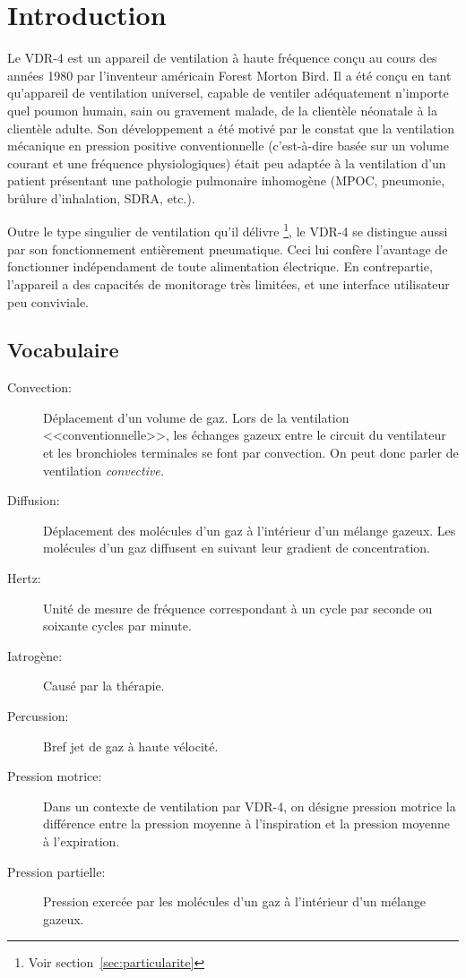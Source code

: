 \chapter{Introduction}

Le VDR-4 est un appareil de ventilation à haute fréquence conçu au cours des
années 1980\cite{Vienne2008} par l'inventeur américain Forest Morton Bird.  Il a été conçu en
tant qu'appareil de ventilation universel, capable de ventiler adéquatement
n'importe quel poumon humain, sain ou gravement malade, de la clientèle
néonatale à la clientèle adulte.  Son développement a été motivé par le constat
que la ventilation mécanique en pression positive conventionnelle (c'est-à-dire
basée sur un volume courant et une fréquence physiologiques) était peu adaptée
à la ventilation d'un patient présentant une pathologie pulmonaire inhomogène
(MPOC, pneumonie, brûlure d'inhalation, SDRA, etc.).

Outre le type singulier de ventilation qu'il délivre \footnote{Voir
section~\ref{sec:particularite}}, le VDR-4 se distingue aussi par son
fonctionnement entièrement pneumatique. Ceci lui confère l'avantage de
fonctionner indépendament de toute alimentation électrique. En contrepartie,
l'appareil a des capacités de monitorage très limitées, et une interface
utilisateur peu conviviale.

\section{Vocabulaire}

\begin{description}
	\item[Convection:] Déplacement d'un volume de gaz. Lors de la ventilation
	<<conventionnelle>>, les échanges gazeux entre le circuit du ventilateur et
	les bronchioles terminales se font par convection\cite{West2017}. On peut donc parler de
		ventilation \em{convective}.  
	\item [Diffusion:] Déplacement des molécules d'un gaz à l'intérieur d'un mélange gazeux. Les molécules d'un gaz diffusent en suivant leur gradient de concentration.
	\item [Hertz:] Unité de mesure de fréquence correspondant à un cycle par seconde ou soixante cycles par minute.
	\item [Iatrogène:] Causé par la thérapie.
	\item [Percussion:] Bref jet de gaz à haute vélocité.
	\item [Pression motrice:] Dans un contexte de ventilation par VDR-4, on désigne pression motrice la différence entre la pression moyenne à l'inspiration et la pression moyenne à l'expiration.
	\item [Pression partielle:] Pression exercée par les molécules d'un gaz à l'intérieur d'un mélange gazeux.
\end{description}

